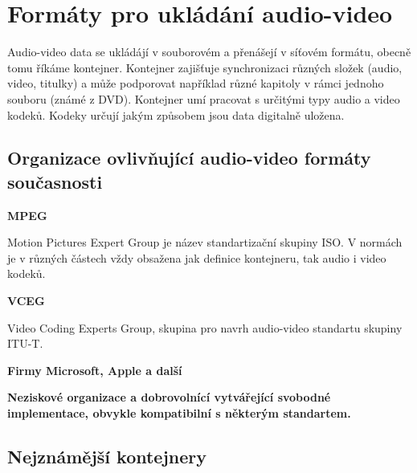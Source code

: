 \chapter{Formáty pro ukládání audio-video}

\vspace{10pt}

Audio-video data se ukládájí v souborovém a přenášejí v síťovém formátu, obecně tomu říkáme kontejner. Kontejner zajišťuje synchronizaci různých složek (audio, video, titulky) a může podporovat například různé kapitoly v rámci jednoho souboru (známé z DVD). Kontejner umí pracovat s určitými typy audio a video kodeků. Kodeky určují jakým způsobem jsou data digitalně uložena. 

\vspace{10pt}

\section{Organizace ovlivňující audio-video formáty současnosti}

\vspace{10pt}

\textbf{MPEG}

Motion Pictures Expert Group je název standartizační skupiny ISO. V normách je v různých částech vždy obsažena jak definice kontejneru, tak audio i video kodeků.

\vspace{10pt}

\textbf{VCEG}

Video Coding Experts Group, skupina pro navrh audio-video standartu skupiny ITU-T.

\vspace{10pt}

\textbf{Firmy Microsoft, Apple a další}

\vspace{10pt}

\textbf{Neziskové organizace a dobrovolnící vytvářející svobodné implementace, obvykle kompatibilní s některým standartem.}

\vspace{10pt}

\section{Nejznámější kontejnery}

\vspace{10pt}

